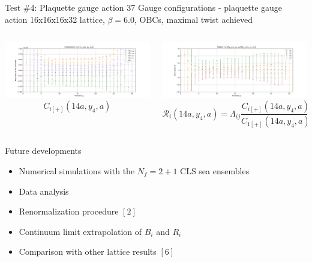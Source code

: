 \documentclass{beamer}
\begin{document}
\begin{frame}{Test \#4: Plaquette gauge action}
      37 Gauge configurations - plaquette gauge action\newline
      16x16x16x32 lattice, $\beta = 6.0$, OBCs, maximal twist achieved
      \begin{columns}
            \begin{column}{.5\textwidth}
                  \includegraphics[width=\textwidth]{../thesis-tex/imgs-MSc-thesis/plaq-3pts.pdf}
                  $$C_{i[+]}(14a,y_4,a)$$
            \end{column}
            \begin{column}{.5\textwidth}
                  \includegraphics[width=\textwidth]{../thesis-tex/imgs-MSc-thesis/ratios.pdf}
                  $$\mathcal{R}_i (14a,y_4,a) = \Lambda_{ij}\frac{C_{i[+]}(14a,y_4,a)}{C_{1[+]}(14a,y_4,a)}$$
            \end{column}
      \end{columns}
\end{frame}

\begin{frame}{Future developments}
      \begin{itemize}
            \item Numerical simulations with the $N_f = 2+1$ CLS sea ensembles
            \item Data analysis 
            \item Renormalization procedure $[2]$
            \item Continuum limit extrapolation of $B_i$ and $R_i$
            \item Comparison with other lattice results $[6]$
      \end{itemize}
\end{frame}
\end{document}
